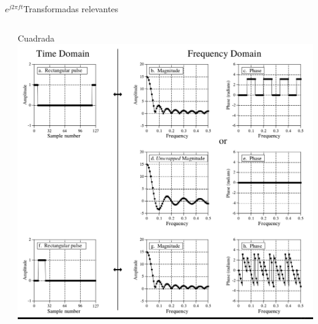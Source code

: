 \begin{frame}{$e^{j2\pi ft}$}{Transformadas relevantes}
\begin{columns}[c]
\begin{column}{.33\textwidth}
      \end{column}
      \begin{column}{.33\textwidth}
         Cuadrada
         \centering\includegraphics[width=1.0\textwidth]{3_clase/equivalencias_cuadrada}
      \end{column}
   \end{columns}
   \vfill
\end{frame}
